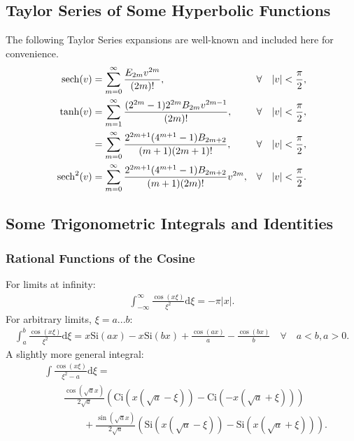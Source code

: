 \subsection{Taylor Series of Some Hyperbolic Functions}

The following Taylor Series expansions are well-known and included here for convenience.
\begin{align}
	\operatorname{sech}(v) &= \sum_{m=0}^\infty \frac{E_{2m} v^{2m}}{(2m)!},
	    &\forall \quad |v| < \frac{\pi}{2}, \\
	\tanh(v) &= \sum_{m=1}^\infty \frac{(2^{2m}-1) 2^{2m} B_{2m} v^{2m-1}}{(2m)!},
	    &\forall \quad |v| < \frac{\pi}{2}, \\
	         &= \sum_{m=0}^\infty \frac{2^{2m+1}(4^{m+1}-1)B_{2m+2}}{(m+1)(2m+1)!},
	         &\forall \quad |v| < \frac{\pi}{2}, \\
	\operatorname{sech}^2(v) &= \sum_{m=0}^\infty \frac{2^{2m+1}(4^{m+1}-1)B_{2m+2}}{(m+1)(2m)!} v^{2m},
	    &\forall \quad |v| < \frac{\pi}{2}.
\end{align}
\subsection{Some Trigonometric Integrals and Identities}
\subsubsection{Rational Functions of the Cosine}
For limits at infinity:
\begin{align}
	\int_{-\infty}^{\infty} \! \frac{\cos(x \xi)}{\xi^2} \mathrm{d}\xi = -\pi|x|.
\end{align}
For arbitrary limits, $\xi = a...b$:
\begin{align}
	\int_a^b \! \frac{\cos(x \xi)}{\xi^2} \mathrm{d}\xi = x\mathrm{Si}(ax) - x\mathrm{Si}(bx) + \frac{\cos(ax)}{a} - \frac{\cos(bx)}{b}
	\quad \forall \quad a < b, a > 0.
\end{align}
A slightly more general integral:
\begin{align}
	&\int \! \frac{\cos(x\xi)}{\xi^2 - a} \mathrm{d}\xi = \\
	&\quad\quad \frac{\cos(\sqrt{a}x)}{2\sqrt{a}} \left(\mathrm{Ci}\left(x(\sqrt{a} - \xi)\right) - \mathrm{Ci}\left(-x(\sqrt{a} + \xi)\right) \right) \\
    &\quad\quad\quad\quad +\frac{\sin(\sqrt{a}x)}{2\sqrt{a}} \left(\mathrm{Si}\left(x(\sqrt{a} - \xi)\right) - \mathrm{Si}\left(x(\sqrt{a} + \xi)\right) \right).
\end{align}

